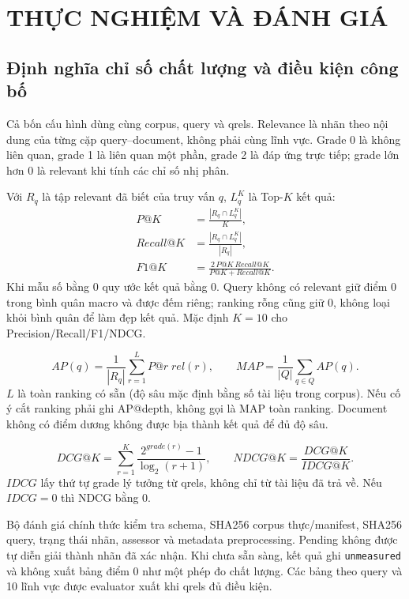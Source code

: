 \chapter{THỰC NGHIỆM VÀ ĐÁNH GIÁ}



\section{Định nghĩa chỉ số chất lượng và điều kiện công bố}

Cả bốn cấu hình dùng cùng corpus, query và qrels. Relevance là nhãn theo nội
dung của từng cặp query--document, không phải cùng lĩnh vực. Grade 0 là không
liên quan, grade 1 là liên quan một phần, grade 2 là đáp ứng trực tiếp;
grade lớn hơn 0 là relevant khi tính các chỉ số nhị phân.

Với $R_q$ là tập relevant đã biết của truy vấn $q$, $L_q^K$ là Top-$K$ kết quả:
\begin{align}
P@K &= \frac{|R_q\cap L_q^K|}{K},\\
Recall@K &= \frac{|R_q\cap L_q^K|}{|R_q|},\\
F1@K &= \frac{2\,P@K\,Recall@K}{P@K+Recall@K}.
\end{align}
Khi mẫu số bằng 0 quy ước kết quả bằng 0. Query không có relevant giữ điểm 0
trong bình quân macro và được đếm riêng; ranking rỗng cũng giữ 0, không loại khỏi
bình quân để làm đẹp kết quả. Mặc định $K=10$ cho Precision/Recall/F1/NDCG.

\begin{equation}
AP(q)=\frac{1}{|R_q|}\sum_{r=1}^{L}P@r\;rel(r),\qquad
MAP=\frac{1}{|Q|}\sum_{q\in Q}AP(q).
\end{equation}
$L$ là toàn ranking có sẵn (độ sâu mặc định bằng số tài liệu trong corpus).
Nếu cố ý cắt ranking phải ghi AP@depth, không gọi là MAP toàn ranking.
Document không có điểm dương không được bịa thành kết quả để đủ độ sâu.

\begin{equation}
DCG@K=\sum_{r=1}^{K}\frac{2^{grade(r)}-1}{\log_2(r+1)},\qquad
NDCG@K=\frac{DCG@K}{IDCG@K}.
\end{equation}
$IDCG$ lấy thứ tự grade lý tưởng từ qrels, không chỉ từ tài liệu đã trả về.
Nếu $IDCG=0$ thì NDCG bằng 0.

Bộ đánh giá chính thức kiểm tra schema, SHA256 corpus thực/manifest, SHA256
query, trạng thái nhãn, assessor và metadata preprocessing. Pending không được
tự diễn giải thành nhãn đã xác nhận. Khi chưa sẵn sàng, kết quả ghi
\texttt{unmeasured} và không xuất bảng điểm 0 như một phép đo chất lượng.
Các bảng theo query và 10 lĩnh vực được evaluator xuất khi qrels đủ điều kiện.

